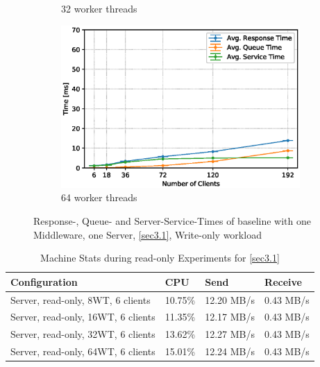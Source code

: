 \documentclass[11pt,a4paper]{article}
\begin{document}
\begin{figure}
\begin{subfigure}{.5\textwidth}
        \caption{32 worker threads}
    \end{subfigure}
    \begin{subfigure}{.5\textwidth}
        \includegraphics[width=1\linewidth]{plots/3_1b_extendedLatencyMiddleware_64w.eps}
        \caption{64 worker threads}
    \end{subfigure}

    \caption{Response-, Queue- and Server-Service-Times of baseline with one Middleware, one Server, \autoref{sec3.1}, Write-only workload}
    \label{fig:3-1-times-writeonly}
\end{figure}

\begin{center}
    \begin{table}
    	\begin{tabular}{|l|p{2cm}|p{2cm}|p{2cm}|}
            \hline \textbf{Configuration} & \textbf{CPU} & \textbf{Send} & \textbf{Receive}\\
            \hline Server, read-only, 8WT, 6 clients & 10.75\%         & 12.20 MB/s    & 0.43 MB/s\\
            \hline Server, read-only, 16WT, 6 clients & 11.35\%         & 12.17 MB/s    & 0.43 MB/s\\
            \hline Server, read-only, 32WT, 6 clients & 13.62\%         & 12.27 MB/s    & 0.43 MB/s\\
            \hline Server, read-only, 64WT, 6 clients & 15.01\%         & 12.24 MB/s    & 0.43 MB/s\\
            \hline
    	\end{tabular}
	\caption{Machine Stats during read-only Experiments for \autoref{sec3.1}}
    \label{dstat:3-1}
	\end{table}
\end{center}
\end{document}
